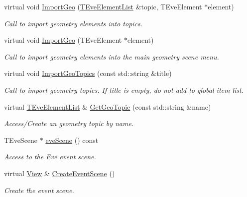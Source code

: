 \begin{DoxyCompactItemize}
virtual void \hyperlink{class_d_d4hep_1_1_view_a84117a020048c8574aa7186d31f0a0ba}{ImportGeo} (\hyperlink{class_t_eve_element_list}{TEveElementList} \&topic, TEveElement $\ast$element)
\begin{DoxyCompactList}\small\item\em Call to import geometry elements into topics. \item\end{DoxyCompactList}\item 
virtual void \hyperlink{class_d_d4hep_1_1_view_aa316fb1bb5375d1e57ba534a510919a7}{ImportGeo} (TEveElement $\ast$element)
\begin{DoxyCompactList}\small\item\em Call to import geometry elements into the main geometry scene menu. \item\end{DoxyCompactList}\item 
virtual void \hyperlink{class_d_d4hep_1_1_view_a2e3e96341bb654afd42e0ae144cecafb}{ImportGeoTopics} (const std::string \&title)
\begin{DoxyCompactList}\small\item\em Call to import geometry topics. If title is empty, do not add to global item list. \item\end{DoxyCompactList}\item 
virtual \hyperlink{class_t_eve_element_list}{TEveElementList} \& \hyperlink{class_d_d4hep_1_1_view_a17ec5ded122ee85a4231ca4976f5b9bd}{GetGeoTopic} (const std::string \&name)
\begin{DoxyCompactList}\small\item\em Access/Create an geometry topic by name. \item\end{DoxyCompactList}\item 
TEveScene $\ast$ \hyperlink{class_d_d4hep_1_1_view_af3bd0cda0c964b1662af9cb24cb26fff}{eveScene} () const 
\begin{DoxyCompactList}\small\item\em Access to the Eve event scene. \item\end{DoxyCompactList}\item 
virtual \hyperlink{class_d_d4hep_1_1_view}{View} \& \hyperlink{class_d_d4hep_1_1_view_a405104d10cef9018701601ae5346d89d}{CreateEventScene} ()
\begin{DoxyCompactList}\small\item\em Create the event scene. \item\end{DoxyCompactList}\item 

\end{DoxyCompactItemize}
